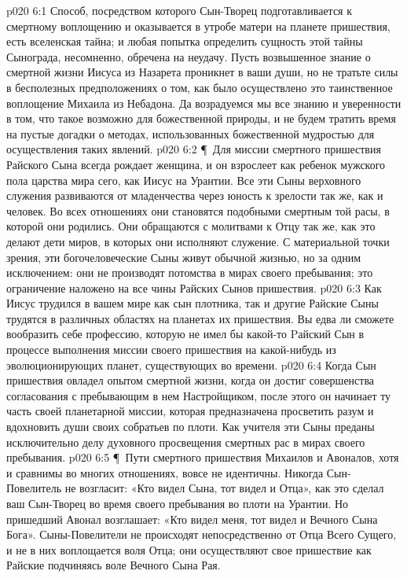 \vs p020 6:1 Способ, посредством которого Сын\hyp{}Творец подготавливается к смертному воплощению и оказывается в утробе матери на планете пришествия, есть вселенская тайна; и любая попытка определить сущность этой тайны Сынограда, несомненно, обречена на неудачу. Пусть возвышенное знание о смертной жизни Иисуса из Назарета проникнет в ваши души, но не тратьте силы в бесполезных предположениях о том, как было осуществлено это таинственное воплощение Михаила из Небадона. Да возрадуемся мы все знанию и уверенности в том, что такое возможно для божественной природы, и не будем тратить время на пустые догадки о методах, использованных божественной мудростью для осуществления таких явлений.
\vs p020 6:2 \P\ Для миссии смертного пришествия Райского Сына всегда рождает женщина, и он взрослеет как ребенок мужского пола царства мира сего, как Иисус на Урантии. Все эти Сыны верховного служения развиваются от младенчества через юность к зрелости так же, как и человек. Во всех отношениях они становятся подобными смертным той расы, в которой они родились. Они обращаются с молитвами к Отцу так же, как это делают дети миров, в которых они исполняют служение. С материальной точки зрения, эти богочеловеческие Сыны живут обычной жизнью, но за одним исключением: они не производят потомства в мирах своего пребывания; это ограничение наложено на все чины Райских Сынов пришествия.
\vs p020 6:3 Как Иисус трудился в вашем мире как сын плотника, так и другие Райские Сыны трудятся в различных областях на планетах их пришествия. Вы едва ли сможете вообразить себе профессию, которую не имел бы какой\hyp{}то Pайский Сын в процессе выполнения миссии своего пришествия на какой\hyp{}нибудь из эволюционирующих планет, существующих во времени.
\vs p020 6:4 Когда Сын пришествия овладел опытом смертной жизни, когда он достиг совершенства согласования с пребывающим в нем Настройщиком, после этого он начинает ту часть своей планетарной миссии, которая предназначена просветить разум и вдохновить души своих собратьев по плоти. Как учителя эти Сыны преданы исключительно делу духовного просвещения смертных рас в мирах своего пребывания.
\vs p020 6:5 \P\ Пути смертного пришествия Михаилов и Авоналов, хотя и сравнимы во многих отношениях, вовсе не идентичны. Никогда Сын\hyp{}Повелитель не возгласит: «Кто видел Сына, тот видел и Отца», как это сделал ваш Сын\hyp{}Творец во время своего пребывания во плоти на Урантии. Но пришедший Авонал возглашает: «Кто видел меня, тот видел и Вечного Сына Бога». Сыны\hyp{}Повелители не происходят непосредственно от Отца Всего Сущего, и не в них воплощается воля Отца; они осуществляют свое пришествие как Райские  подчиняясь воле Вечного Сына Рая.
